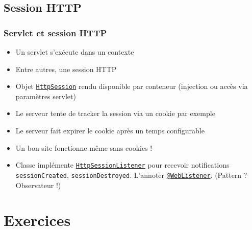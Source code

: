 \documentclass[english, french]{beamer}
\begin{document}
\subsection{Session HTTP}
\begin{frame}
	\frametitle{Servlet et session HTTP}
	\begin{itemize}
		\item Un servlet s’exécute dans un contexte
		\item Entre autres, une session HTTP
		\item Objet \href{http://docs.oracle.com/javaee/7/api/javax/servlet/http/HttpSession.html}{\texttt{HttpSession}} rendu disponible par conteneur ({\tiny injection ou } accès via paramètres servlet)
		\item Le serveur tente de tracker la session via un cookie {\tiny par exemple}
		\item Le serveur fait expirer le cookie après un temps configurable
		\item Un bon site fonctionne même sans cookies !
		\item Classe implémente \href{http://docs.oracle.com/javaee/7/api/javax/servlet/http/HttpSessionListener.html}{\texttt{HttpSessionListener}} pour recevoir notifications \texttt{sessionCreated}, \texttt{sessionDestroyed}.  L’annoter \href{http://docs.oracle.com/javaee/7/api/javax/servlet/annotation/WebListener.html}{\texttt{@WebListener}}. (Pattern ? \pause Observateur !)
	\end{itemize}
\end{frame}

\section{Exercices}
\end{document}
